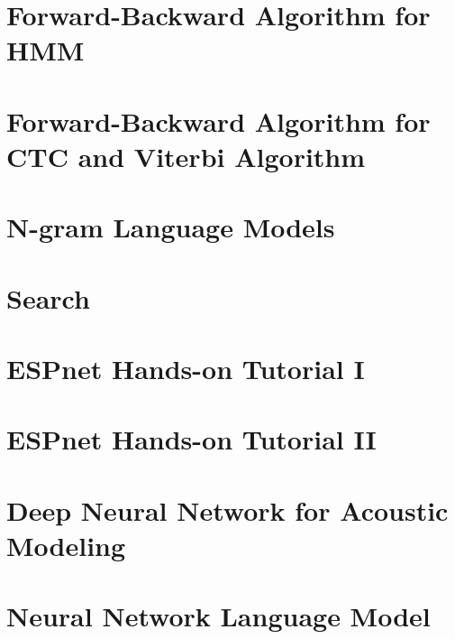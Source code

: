 \documentclass[a4paper]{article}
\begin{document}
\section{Forward-Backward Algorithm for HMM}


\section{Forward-Backward Algorithm for CTC and Viterbi Algorithm}


\section{N-gram Language Models}


\section{Search}


\section{ESPnet Hands-on Tutorial I}


\section{ESPnet Hands-on Tutorial II}


\section{Deep Neural Network for Acoustic Modeling}


\section{Neural Network Language Model}

\end{document}
